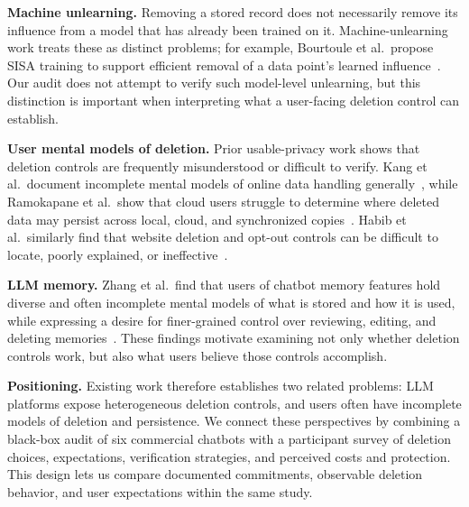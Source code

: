 \documentclass[conference,compsoc]{IEEEtran}
\begin{document}
\textbf{Machine unlearning.} Removing a stored record does not necessarily
remove its influence from a model that has already been trained on it.
Machine-unlearning work treats these as distinct problems; for example,
Bourtoule et al.\ propose SISA training to support efficient removal of a
data point's learned influence~\cite{bourtoule2021machine}. Our audit does
not attempt to verify such model-level unlearning, but this distinction is
important when interpreting what a user-facing deletion control can establish.

\textbf{User mental models of deletion.} Prior usable-privacy work shows
that deletion controls are frequently misunderstood or difficult to verify.
Kang et al.\ document incomplete mental models of online data handling
generally~\cite{kang2015mydata}, while Ramokapane et al.\ show that cloud
users struggle to determine where deleted data may persist across local,
cloud, and synchronized copies~\cite{ramokapane2017stupid}. Habib et al.\
similarly find that website deletion and opt-out controls can be difficult to
locate, poorly explained, or ineffective~\cite{habib2019empirical}.

\textbf{LLM memory.} Zhang et al.\ find that users of chatbot memory
features hold diverse and often incomplete mental models of what is stored
and how it is used, while expressing a desire for finer-grained control over
reviewing, editing, and deleting memories~\cite{zhang2025understanding}.
These findings motivate examining not only whether deletion controls work,
but also what users believe those controls accomplish.

\textbf{Positioning.} Existing work therefore establishes two related
problems: LLM platforms expose heterogeneous deletion controls, and users
often have incomplete models of deletion and persistence. We connect these
perspectives by combining a black-box audit of six commercial chatbots with
a participant survey of deletion choices, expectations, verification
strategies, and perceived costs and protection. This design lets us compare
documented commitments, observable deletion behavior, and user expectations
within the same study.
\end{document}

